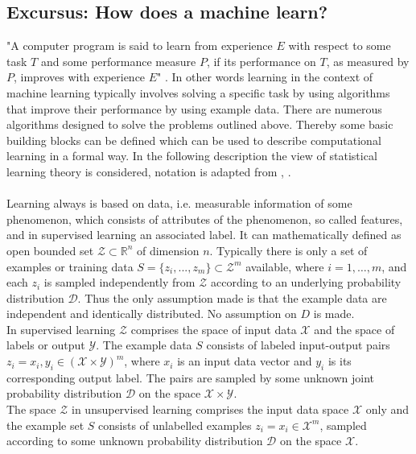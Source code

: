 \begin{tcolorbox}
    \subsection*{Excursus: How does a machine learn?}
    "A computer program is said to learn from experience $E$ with respect to some task $T$ and some performance measure $P$, if its performance on $T$, as measured by $P$, improves with experience $E$" \cite{Mitchell1997}. In other words learning in the context of machine learning typically involves solving a specific task by using algorithms that improve their performance by using example data. There are numerous algorithms designed to solve the problems outlined above. Thereby some basic building blocks can be defined which can be used to describe computational learning in a formal way. In the following description the view of statistical learning theory is considered, notation is adapted from \citeauthor{Shalev2014} \cite{Shalev2014}, \citeauthor{Von_luxburg2011} \cite{Von_luxburg2011}.\\
    \\
    Learning always is based on data, i.e. measurable information of some phenomenon, which consists of attributes of the phenomenon, so called features, and in supervised learning an associated label. It can mathematically defined as open bounded set $\mathcal{Z}\subset\mathbb{R}^n$ of dimension $n$. Typically there is only a set of examples or training data $S=\{z_i,...,z_m\}\subset{\mathcal{Z}}^m$ available, where $i = 1,\dots,m$, and each $z_i$ is sampled independently from $\mathcal{Z}$ according to an underlying probability distribution $\mathcal{D}$. Thus the only assumption made is that the example data are independent and identically distributed. No assumption on $D$ is made.\\
    In supervised learning $\mathcal{Z}$ comprises the space of input data $\mathcal{X}$ and the space of labels or output $\mathcal{Y}$. The example data $S$ consists of labeled input-output pairs $z_i=x_i,y_i\in(\mathcal{X}\times\mathcal{Y})^m$, where $x_i$ is an input data vector and $y_i$ is its corresponding output label. The pairs are sampled by some unknown joint probability distribution $\mathcal{D}$ on the space $\mathcal{X}\times\mathcal{Y}$.\\
    The space $\mathcal{Z}$ in unsupervised learning comprises the input data space $\mathcal{X}$ only and the example set $S$ consists of unlabelled examples $z_i=x_i\in\mathcal{X}^m$, sampled according to some unknown probability distribution $\mathcal{D}$ on the space $\mathcal{X}$.\\

\end{tcolorbox}
